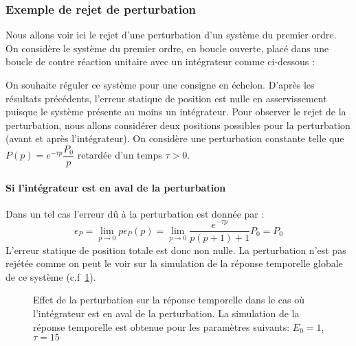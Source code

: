 \subsubsection{Exemple de rejet de perturbation}
Nous allons voir ici le rejet d'une perturbation d'un système du premier ordre. 
On considère le système du premier ordre, en boucle ouverte, placé dans une 
boucle de contre réaction unitaire avec un intégrateur comme ci-dessous :
\begin{center}                           
    
\end{center}                             
On souhaite réguler ce système pour une consigne en échelon.
D'après les résultats précédents, l'erreur statique de position est nulle 
en asservissement puisque le système présente au moins un intégrateur. 
Pour observer le rejet de la perturbation, nous allons considérer 
deux positions possibles pour la perturbation (avant et après 
l'intégrateur). On considère une perturbation constante telle 
que $P(p)=e^{-\tau p}\dfrac{P_0}{p}$ retardée d'un temps $\tau>0$. 
\paragraph{Si l'intégrateur est en aval de la perturbation}
Dans un tel cas l'erreur dû à la perturbation est donnée par :
$$
\epsilon_P=\lim\limits_{p\to0}p\epsilon_P(p)=
\lim\limits_{p\to0}\dfrac{e^{-\tau p}}{p(p+1)+1}P_0=P_0
$$
L'erreur statique de position totale est donc non nulle. La perturbation
n'est pas rejétée comme on peut le voir sur la simulation de la réponse
temporelle globale de ce système (c.f~\cref{fig-pert1}).
\begin{figure}[!h]
    \centering
    
    \caption{Effet de la perturbation sur la réponse temporelle dans le cas
             où l'intégrateur est en aval de la perturbation. La simulation 
             de la réponse temporelle est obtenue pour les paramètres suivants:
             $E_0=1$, $\tau=15$\label{fig-pert1}}
\end{figure}
